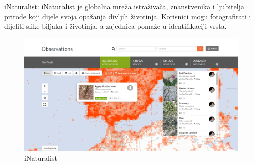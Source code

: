 		\begin{packed_item}
			\item iNaturalist: iNaturalist je globalna mreža istraživača, znanstvenika i ljubitelja prirode koji dijele svoja opažanja divljih životinja. Korisnici mogu fotografirati i dijeliti slike biljaka i životinja, a zajednica pomaže u identifikaciji vrsta. 
			\begin{figure}[H]
				\includegraphics[width=\textwidth]{slike/inaturalist.PNG} %
				\caption{iNaturalist}
				\label{fig:inaturalist} %
			\end{figure}
			

\end{packed_item}
